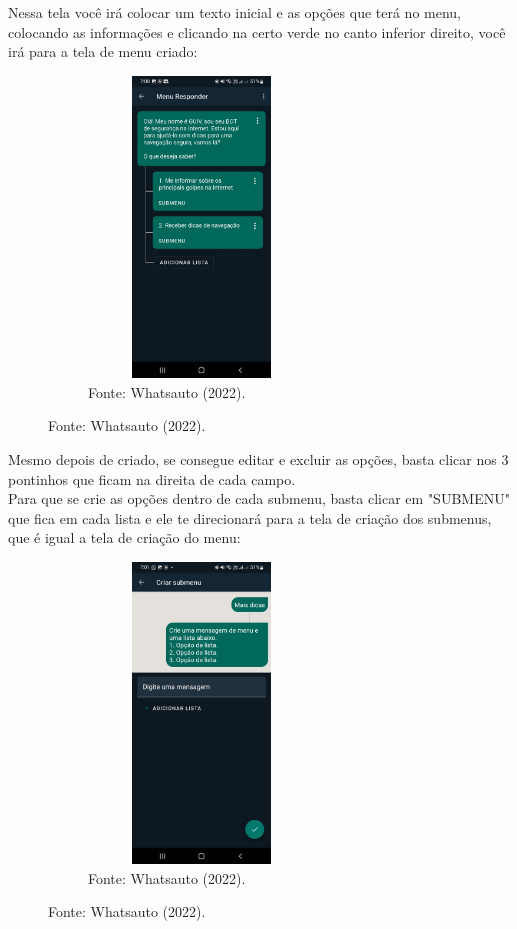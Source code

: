 \begin{itemize}
        Nessa tela você irá colocar um texto inicial e as opções que terá no menu, colocando as informações e clicando na certo verde no canto inferior direito, você irá para a tela de menu criado: \newpage

\begin{figure}[!htb]
\centering
\captionsetup[subfigure]{labelformat=empty}
\caption{``Menu 3''}
\begin{subfigure}{.5\textwidth}
\centering
\includegraphics[width=6cm,height=8cm]{Partes/Imagens/Menu 3.jpeg}
\caption{Fonte: Whatsauto (2022).}
\end{subfigure}%
\end{figure}

        Mesmo depois de criado, se consegue editar e excluir as opções, basta clicar nos 3 pontinhos que ficam na direita de cada campo. \\

        Para que se crie as opções dentro de cada submenu, basta clicar em "SUBMENU" que fica em cada lista e ele te direcionará para a tela de criação dos submenus, que é igual a tela de criação do menu:

\begin{figure}[!htb]
\centering
\captionsetup[subfigure]{labelformat=empty}
\caption{``Submenu 1''}
\begin{subfigure}{.5\textwidth}
\centering
\includegraphics[width=6cm,height=8cm]{Partes/Imagens/Submenu 1.jpeg}
\caption{Fonte: Whatsauto (2022).}
\end{subfigure}%
\end{figure}



\end{itemize}

